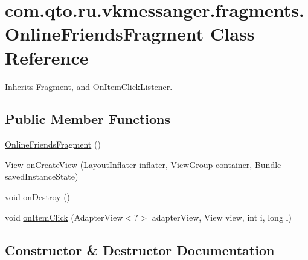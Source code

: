 \hypertarget{classcom_1_1qto_1_1ru_1_1vkmessanger_1_1fragments_1_1_online_friends_fragment}{}\section{com.\+qto.\+ru.\+vkmessanger.\+fragments.\+Online\+Friends\+Fragment Class Reference}
\label{classcom_1_1qto_1_1ru_1_1vkmessanger_1_1fragments_1_1_online_friends_fragment}


Inherits Fragment, and On\+Item\+Click\+Listener.

\subsection*{Public Member Functions}
\begin{DoxyCompactItemize}
\item 
\hyperlink{classcom_1_1qto_1_1ru_1_1vkmessanger_1_1fragments_1_1_online_friends_fragment_a4b4219d23a160ec3c7ae3c5aee6e72e6}{Online\+Friends\+Fragment} ()
\item 
View \hyperlink{classcom_1_1qto_1_1ru_1_1vkmessanger_1_1fragments_1_1_online_friends_fragment_af41905e44653d52b5b324eab7bfa7330}{on\+Create\+View} (Layout\+Inflater inflater, View\+Group container, Bundle saved\+Instance\+State)
\item 
void \hyperlink{classcom_1_1qto_1_1ru_1_1vkmessanger_1_1fragments_1_1_online_friends_fragment_a2f19a8c4bd00c792aab2402fb5d4addb}{on\+Destroy} ()
\item 
void \hyperlink{classcom_1_1qto_1_1ru_1_1vkmessanger_1_1fragments_1_1_online_friends_fragment_a051a7caece02e074a0266cc2746d1bd5}{on\+Item\+Click} (Adapter\+View$<$?$>$ adapter\+View, View view, int i, long l)
\end{DoxyCompactItemize}


\subsection{Constructor \& Destructor Documentation}
\hypertarget{classcom_1_1qto_1_1ru_1_1vkmessanger_1_1fragments_1_1_online_friends_fragment_a4b4219d23a160ec3c7ae3c5aee6e72e6}{}
